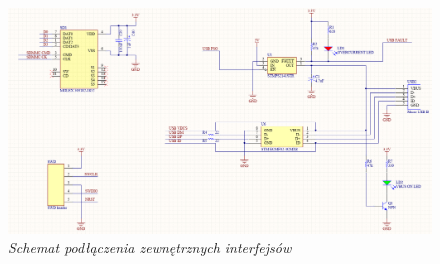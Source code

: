 \documentclass[eng,printmode]{mgr}
\begin{document}
\begin{figure}[!h]
    \centering
    \includegraphics[width=\textwidth]{schematics/conn.png}
    \caption{\textit{\scriptsize Schemat podłączenia zewnętrznych interfejsów}}
\end{figure}
\end{document}
